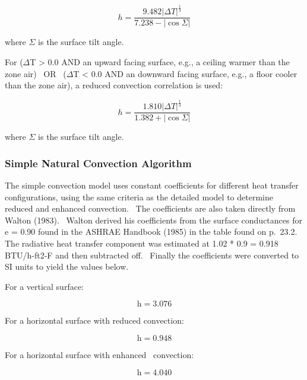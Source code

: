 \begin{equation}
h = \frac{{9.482{{\left| {\Delta T} \right|}^{\frac{1}{3}}}}}{{7.238 - \left| {\cos \Sigma } \right|}}
\end{equation}

where $\Sigma$ is the surface tilt angle.

For ($\Delta$T \textgreater{} 0.0 AND an upward facing surface, e.g., a ceiling warmer than the zone air)~ OR~ ($\Delta$T \textless{} 0.0 AND an downward facing surface, e.g., a floor cooler than the zone air), a reduced convection correlation is used:

\begin{equation}
h = \frac{{1.810{{\left| {\Delta T} \right|}^{\frac{1}{3}}}}}{{1.382 + \left| {\cos \Sigma } \right|}}
\end{equation}

where $\Sigma$ is the surface tilt angle.

\subsubsection{Simple Natural Convection Algorithm}\label{simple-natural-convection-algorithm}

The simple convection model uses constant coefficients for different heat transfer configurations, using the same criteria as the detailed model to determine reduced and enhanced convection.~ The coefficients are also taken directly from Walton (1983).~ Walton derived his coefficients from the surface conductances for e = 0.90 found in the ASHRAE Handbook (1985) in the table found on p.~23.2.~ The radiative heat transfer component was estimated at 1.02 * 0.9 = 0.918 BTU/h-ft2-F and then subtracted off.~ Finally the coefficients were converted to SI units to yield the values below.

For a vertical surface:

\begin{equation}
{\mathrm{h  =  3}}{\mathrm{.076}}
\end{equation}

For a horizontal surface with reduced convection:

\begin{equation}
{\mathrm{h  =  0}}{\mathrm{.948}}
\end{equation}

For a horizontal surface with enhanced~ convection:

\begin{equation}
{\mathrm{h  =  4}}{\mathrm{.040}}
\end{equation}

